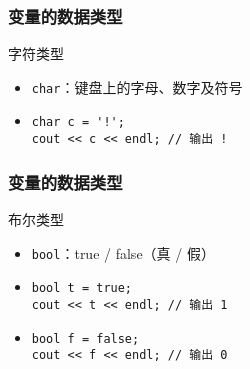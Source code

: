 \begin{frame}[fragile]
    \frametitle{变量的数据类型}

    \begin{block}{字符类型}

        \begin{itemize}
            \item \lstinline|char|：键盘上的字母、数字及符号
        \end{itemize}

    \end{block}

    \begin{itemize}
        \item
            \lstinline|char c = '!';|\\
            \lstinline|cout << c << endl; // 输出 !|
    \end{itemize}
\end{frame}

\begin{frame}[fragile]
    \frametitle{变量的数据类型}

    \begin{block}{布尔类型}

        \begin{itemize}
            \item \lstinline|bool|：true / false（真 / 假）
        \end{itemize}

    \end{block}

    \begin{itemize}
        \item
            \lstinline|bool t = true;|\\
            \lstinline|cout << t << endl; // 输出 1|

        \item
            \lstinline|bool f = false;|\\
            \lstinline|cout << f << endl; // 输出 0|
    \end{itemize}
\end{frame}

